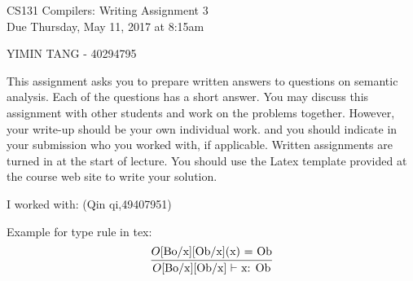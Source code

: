 \documentclass[10pt]{article}
\newcommand{\infertext}[2]{\infer{{\textrm{#1}}}{#2}}
\begin{document}
\begin{center}
\Large CS131 Compilers: Writing Assignment 3\\Due Thursday, May 11, 2017 at 8:15am
\end{center}

\begin{center}
\LARGE YIMIN TANG - 40294795
\end{center}

This assignment asks you to prepare written answers to questions on
semantic analysis. Each of the questions has a short answer. You
may discuss this assignment with other students and work on the problems
together. However, your write-up should be your own individual work.
and you should indicate in your submission who you worked with, if applicable.
Written assignments are turned in at the start of lecture.
You should use the Latex template provided at the course web site to write your solution.

\begin{center}
I worked with: (Qin qi,49407951)
\end{center}

Example for type rule in tex:
\[\infertext
          {$O$[Bo/x][Ob/x] $\vdash$ x: Ob}
          {\textrm{$O$[Bo/x][Ob/x](x) = Ob}}       
\]
\end{document}
